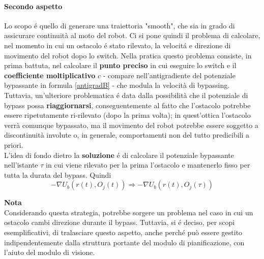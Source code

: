 \documentclass[14pt,a4paper]{extarticle}
\begin{document}

\paragraph{Secondo aspetto}
Lo scopo é quello di generare una traiettoria "smooth", che sia in grado di assicurare continuità al moto del robot. Ci si pone quindi il problema di calcolare, nel momento in cui un ostacolo é stato rilevato, la velocitá e direzione di movimento del robot dopo lo switch. Nella pratica questo problema consiste, in prima battuta, nel calcolare il \textbf{punto preciso} in cui eseguire lo switch e il \textbf{coefficiente moltiplicativo} \(c\) - compare nell'antigradiente del potenziale bypassante in formula \ref{antigradB} - che modula la velocità di bypassing. Tuttavia, un'ulteriore problematica é data dalla possibilità che il potenziale di bypass possa \textbf{riaggiornarsi}, conseguentemente al fatto che l'ostacolo potrebbe essere ripetutamente ri-rilevato (dopo la prima volta); in quest'ottica l'ostacolo verrà comunque bypassato, ma il movimento del robot potrebbe essere soggetto a discontinuità involute o, in generale, comportamenti non del tutto predicibili a priori. \\
L'idea di fondo dietro la \textbf{soluzione} é di calcolare il potenziale bypassante nell'istante \(\tau\) in cui viene rilevato per la prima l'ostacolo e mantenerlo fisso per tutta la durata del bypass. Quindi \[-\nabla U_b \left( r(t) , O_j(t) \right) \Rightarrow -\nabla U_b \left( r(t) , O_j(\tau) \right) \]
\begin{nota}
\textbf{Nota} \\ Considerando questa strategia, potrebbe sorgere un problema nel caso in cui un ostacolo cambi direzione durante il bypass. Tuttavia, si é deciso, per scopi esemplificativi, di tralasciare questo aspetto, anche perché può essere gestito indipendentemente dalla struttura portante del modulo di pianificazione, con l'aiuto del modulo di visione.
\end{nota}

\end{document}

